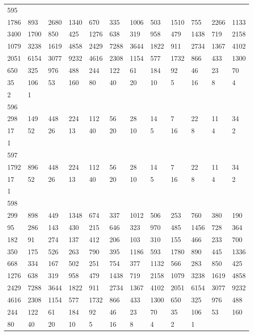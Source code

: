 \begin{longtable}{llllllllllll}
595&&&&&&&&&&&\\
1786& 893& 2680& 1340& 670& 335& 1006& 503& 1510& 755& 2266& 1133\\
3400& 1700& 850& 425& 1276& 638& 319& 958& 479& 1438& 719& 2158\\
1079& 3238& 1619& 4858& 2429& 7288& 3644& 1822& 911& 2734& 1367& 4102\\
2051& 6154& 3077& 9232& 4616& 2308& 1154& 577& 1732& 866& 433& 1300\\
650& 325& 976& 488& 244& 122& 61& 184& 92& 46& 23& 70\\
35& 106& 53& 160& 80& 40& 20& 10& 5& 16& 8& 4\\
2& 1& \\

596&&&&&&&&&&&\\
298& 149& 448& 224& 112& 56& 28& 14& 7& 22& 11& 34\\
17& 52& 26& 13& 40& 20& 10& 5& 16& 8& 4& 2\\
1& \\

597&&&&&&&&&&&\\
1792& 896& 448& 224& 112& 56& 28& 14& 7& 22& 11& 34\\
17& 52& 26& 13& 40& 20& 10& 5& 16& 8& 4& 2\\
1& \\

598&&&&&&&&&&&\\
299& 898& 449& 1348& 674& 337& 1012& 506& 253& 760& 380& 190\\
95& 286& 143& 430& 215& 646& 323& 970& 485& 1456& 728& 364\\
182& 91& 274& 137& 412& 206& 103& 310& 155& 466& 233& 700\\
350& 175& 526& 263& 790& 395& 1186& 593& 1780& 890& 445& 1336\\
668& 334& 167& 502& 251& 754& 377& 1132& 566& 283& 850& 425\\
1276& 638& 319& 958& 479& 1438& 719& 2158& 1079& 3238& 1619& 4858\\
2429& 7288& 3644& 1822& 911& 2734& 1367& 4102& 2051& 6154& 3077& 9232\\
4616& 2308& 1154& 577& 1732& 866& 433& 1300& 650& 325& 976& 488\\
244& 122& 61& 184& 92& 46& 23& 70& 35& 106& 53& 160\\
80& 40& 20& 10& 5& 16& 8& 4& 2& 1& \\


\end{longtable}
